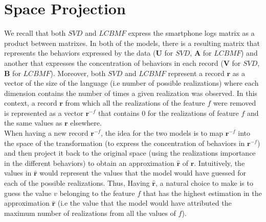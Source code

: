 
\section{Space Projection}

We recall that both $SVD$ and $LCBMF$ express the smartphone logs matrix as a product between matrixes. In both of the models, there is a resulting matrix that represents the behaviors expressed by the data ($\boldsymbol{U}$ for $SVD$, $\boldsymbol{A}$ for $LCBMF$) and another that expresses the concentration of behaviors in each record ($\boldsymbol{V}$ for $SVD$, $\boldsymbol{B}$ for $LCBMF$). Moreover, both $SVD$ and $LCBMF$ represent a record $\mathbf{r}$ as a vector of the size of the language (i.e number of possible realizations) where each dimension contains the number of times a given realization was observed. In this context, a record $\mathbf{r}$ from which all the realizations of the feature $f$ were removed is represented as a vector $\mathbf{r}^{-f}$ that contains $0$ for the realizations of feature $f$ and the same values as $\mathbf{r}$ elsewhere.
\\When having a new record $\mathbf{r}^{-f}$, the idea for the two models is to map $\mathbf{r}^{-f}$ into the space of the transformation (to express the concentration of behaviors in  $\mathbf{r}^{-f}$) and then project it back to the original space (using the realizations importance in the different behaviors) to obtain an approximation $\mathbf{\widehat{r}}$ of $\mathbf{r}$. Intuitively, the values in $\mathbf{\widehat{r}}$ would represent the values that the model would have guessed for each of the possible realizations. Thus, Having $\mathbf{\widehat{r}}$, a natural choice to make is to guess the value $v$ belonging to the feature $f$ that has the highest estimation in the approximation $\mathbf{\widehat{r}}$ (i.e the value that the model would have attributed the maximum number of realizations from all the values of $f$). \par

